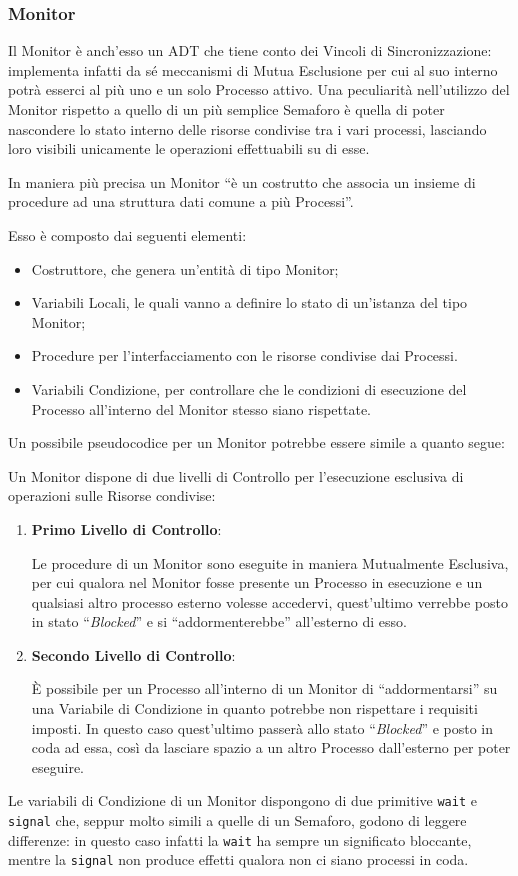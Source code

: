 \subsubsection{Monitor}
Il Monitor\cite{Monitor} è anch'esso un ADT che tiene conto dei Vincoli di Sincronizzazione: implementa infatti da sé meccanismi di Mutua Esclusione per cui al suo interno potrà esserci al più uno e un solo Processo attivo. Una peculiarità nell'utilizzo del Monitor rispetto a quello di un più semplice Semaforo è quella di poter nascondere lo stato interno delle risorse condivise tra i vari processi, lasciando loro visibili unicamente le operazioni effettuabili su di esse. \par
In maniera più precisa un Monitor ``è un costrutto che associa un insieme di procedure ad una struttura dati comune a più Processi''\cite{MonitorDispense}. \par
Esso è composto dai seguenti elementi:
\begin{itemize}
    \item Costruttore, che genera un'entità di tipo Monitor;
    \item Variabili Locali, le quali vanno a definire lo stato di un'istanza del tipo Monitor;
    \item Procedure per l'interfacciamento con le risorse condivise dai Processi.
    \item Variabili Condizione, per controllare che le condizioni di esecuzione del Processo all'interno del Monitor stesso siano rispettate.
\end{itemize}
Un possibile pseudocodice per un Monitor potrebbe essere simile a quanto segue: \par

Un Monitor dispone di due livelli di Controllo per l'esecuzione esclusiva di operazioni sulle Risorse condivise:
\begin{enumerate}
    \item \textbf{Primo Livello di Controllo}: \par
    Le procedure di un Monitor sono eseguite in maniera Mutualmente Esclusiva, per cui qualora nel Monitor fosse presente un Processo in esecuzione e un qualsiasi altro processo esterno volesse accedervi, quest'ultimo verrebbe posto in stato ``\textit{Blocked}'' e si ``addormenterebbe'' all'esterno di esso.
    \item \textbf{Secondo Livello di Controllo}: \par
    È possibile per un Processo all'interno di un Monitor di ``addormentarsi'' su una Variabile di Condizione in quanto potrebbe non rispettare i requisiti imposti. In questo caso quest'ultimo passerà allo stato ``\textit{Blocked}'' e posto in coda ad essa, così da lasciare spazio a un altro Processo dall'esterno per poter eseguire.
\end{enumerate}
Le variabili di Condizione di un Monitor dispongono di due primitive \texttt{wait} e \texttt{signal} che, seppur molto simili a quelle di un Semaforo, godono di leggere differenze: in questo caso infatti la \texttt{wait} ha sempre un significato bloccante, mentre la \texttt{signal} non produce effetti qualora non ci siano processi in coda.
